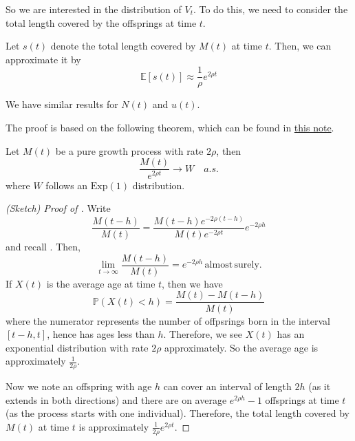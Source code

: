 \documentclass{article}
\begin{document}
So we are interested in the distribution of $V_t$. To do this, we need to consider the total length covered by the offsprings at time $t$.  

\begin{proposition}\label{prop:total_length}
    Let $s(t)$ denote the total length covered by $M(t)$ at time $t$. Then, we can approximate it by 
    \begin{equation}
        \mathbb{E}[s(t)] \approx \frac{1}{\rho} e^{2\rho t}
    \end{equation}

    We have similar results for $N(t)$ and $u(t)$.  
\end{proposition}

The proof is based on the following theorem, which can be found in \hyperlink{http://galton.uchicago.edu/ ̃lalley/Courses/312/Branching.pdf}{this note}.

\begin{theorem}\label{thm:branching}
    Let $M(t)$ be a pure growth process with rate $2\rho$, then 
    \begin{equation*}
        \frac{M(t)}{e^{2\rho t}} \to W \quad a.s.
    \end{equation*}
    where $W$ follows an $\mathrm{Exp}(1)$ distribution.  
\end{theorem}

\begin{proof}[(Sketch) Proof of ]
    Write
    \begin{equation*}
        \frac{M(t-h)}{M(t)}=\frac{M(t-h)e^{-2\rho(t-h)}}{M(t)e^{-2\rho t}}e^{-2\rho h}
    \end{equation*}
    and recall . Then,
    \begin{equation*}
        \operatorname*{lim}_{t\rightarrow\infty}\frac{M(t-h)}{M(t)}=e^{-2\rho h}\mathrm{\,almost\,surely.}
    \end{equation*}
    If $X(t)$ is the average age at time $t$, then we have 
    \begin{equation*}
        \mathbb{P}(X(t)<h) = \frac{M(t)-M(t-h)}{M(t)}
    \end{equation*}
    where the numerator represents the number of offpsrings born in the interval $[t-h,t]$, hence has ages less than $h$. Therefore, we see $X(t)$ has an exponential distribution with rate $2\rho$ approximately.  So the average age is approximately $\frac{1}{2\rho}$.   

    Now we note an offspring with age $h$ can cover an interval of length $2h$ (as it extends in both directions) and there are on average $e^{2\rho h}-1$ offsprings at time $t$ (as the process starts with one individual). Therefore, the total length covered by $M(t)$ at time $t$ is approximately $\frac{1}{2\rho}e^{2\rho t}$.
\end{proof}  
\end{document}

